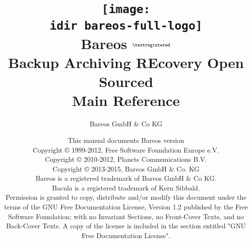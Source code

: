 
\begin{titlepage}

\title{\texttt{[image: \\idir bareos-full-logo]} \\
\Huge{Bareos} $^{\normalsize \textregistered}$\\
\huge{Backup Archiving REcovery Open Sourced}\\[2ex]
Main Reference\\
}

\author{Bareos GmbH \& Co KG}
\date{This manual documents Bareos version \version \\
      \vspace{0.2in}
      Copyright {\copyright} 1999-2012, Free Software Foundation Europe e.V. \\
      Copyright {\copyright} 2010-2012, Planets Communications B.V. \\
      Copyright {\copyright} 2013-2015, Bareos GmbH \& Co. KG \\
      Bareos {\textregistered} is a registered trademark of Bareos GmbH \& Co KG.\\
      Bacula {\textregistered} is a registered trademark of Kern Sibbald.\\
      \vspace{0.2in}
  Permission is granted to copy, distribute and/or modify this document under the terms of the
  GNU Free Documentation License, Version 1.2 published by the Free Software Foundation;
  with no Invariant Sections, no Front-Cover Texts, and no Back-Cover Texts.
  A copy of the license is included in the section entitled "GNU Free Documentation License".
}

\maketitle

\end{titlepage}
